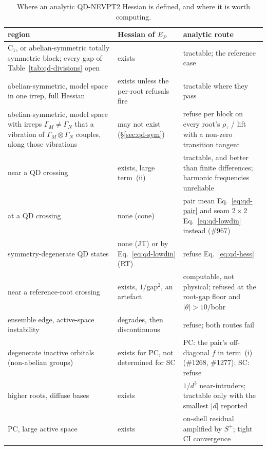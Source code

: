 \documentclass[11pt]{article}
\begin{document}
\begin{table}[htbp]
\centering
\small
\begin{tabular}{@{}p{}p{}p{}@{}}
\toprule
region & Hessian of $E_P$ & analytic route \\
\midrule
C$_1$, or abelian-symmetric totally symmetric block; every gap of Table~\ref{tab:qd-divisions} open & exists & tractable; the reference case \\
abelian-symmetric, model space in one irrep, full Hessian & exists unless the per-root refusals fire & tractable where they pass \\
abelian-symmetric, model space with irreps $\Gamma_M \neq \Gamma_N$ that a vibration of $\Gamma_M\otimes\Gamma_N$ couples, along those vibrations & may not exist (\S\ref{sec:qd-sym}) & refuse per block on every root's $\rho_\tau$ / lift with a non-zero transition tangent \\
near a QD crossing & exists, large term~(ii) & tractable, and better than finite differences; harmonic frequencies unreliable \\
at a QD crossing & none (cone) & pair mean Eq.~\eqref{eq:qd-pair} and seam $2\times2$ Eq.~\eqref{eq:qd-lowdin} instead (\#967) \\
symmetry-degenerate QD states & none (JT) or by Eq.~\eqref{eq:qd-lowdin} (RT) & refuse Eq.~\eqref{eq:qd-hess} \\
near a reference-root crossing & exists, $1/\text{gap}^2$, an artefact & computable, not physical; refused at the root-gap floor and $|\theta| > 10$/bohr \\
ensemble edge, active-space instability & degrades, then discontinuous & refuse; both routes fail \\
degenerate inactive orbitals (non-abelian groups) & exists for PC, not determined for SC & PC: the pair's off-diagonal $f$ in term~(i) (\#1268, \#1277); SC: refuse \\
higher roots, diffuse bases & exists & $1/d^3$ near-intruders; tractable only with the smallest $|d|$ reported \\
PC, large active space & exists & on-shell residual amplified by $S^+$; tight CI convergence \\
\bottomrule
\end{tabular}
\caption{Where an analytic QD-NEVPT2 Hessian is defined, and where it is
worth computing.}
\label{tab:qd-regions}
\end{table}

\end{document}
